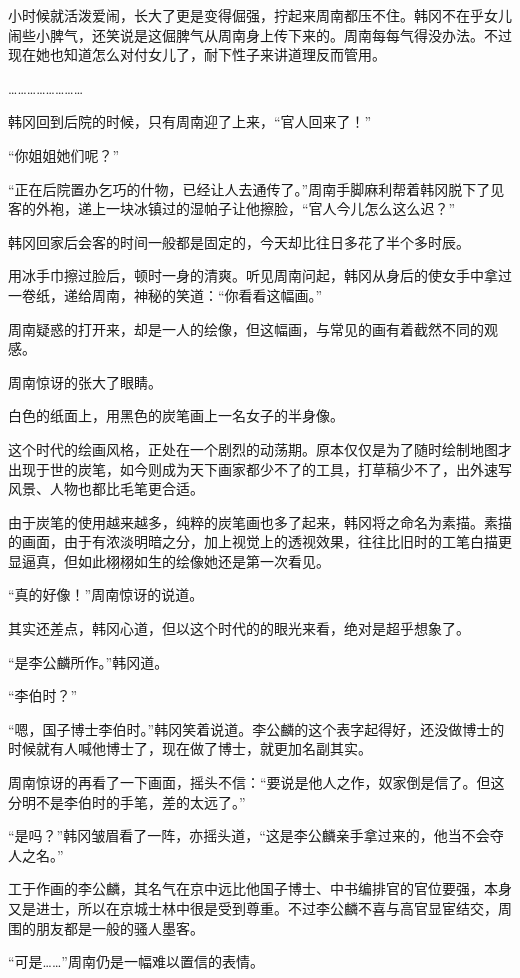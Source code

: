 小时候就活泼爱闹，长大了更是变得倔强，拧起来周南都压不住。韩冈不在乎女儿闹些小脾气，还笑说是这倔脾气从周南身上传下来的。周南每每气得没办法。不过现在她也知道怎么对付女儿了，耐下性子来讲道理反而管用。

……………………

韩冈回到后院的时候，只有周南迎了上来，“官人回来了！”

“你姐姐她们呢？”

“正在后院置办乞巧的什物，已经让人去通传了。”周南手脚麻利帮着韩冈脱下了见客的外袍，递上一块冰镇过的湿帕子让他擦脸，“官人今儿怎么这么迟？”

韩冈回家后会客的时间一般都是固定的，今天却比往日多花了半个多时辰。

用冰手巾擦过脸后，顿时一身的清爽。听见周南问起，韩冈从身后的使女手中拿过一卷纸，递给周南，神秘的笑道：“你看看这幅画。”

周南疑惑的打开来，却是一人的绘像，但这幅画，与常见的画有着截然不同的观感。

周南惊讶的张大了眼睛。

白色的纸面上，用黑色的炭笔画上一名女子的半身像。

这个时代的绘画风格，正处在一个剧烈的动荡期。原本仅仅是为了随时绘制地图才出现于世的炭笔，如今则成为天下画家都少不了的工具，打草稿少不了，出外速写风景、人物也都比毛笔更合适。

由于炭笔的使用越来越多，纯粹的炭笔画也多了起来，韩冈将之命名为素描。素描的画面，由于有浓淡明暗之分，加上视觉上的透视效果，往往比旧时的工笔白描更显逼真，但如此栩栩如生的绘像她还是第一次看见。

“真的好像！”周南惊讶的说道。

其实还差点，韩冈心道，但以这个时代的的眼光来看，绝对是超乎想象了。

“是李公麟所作。”韩冈道。

“李伯时？”

“嗯，国子博士李伯时。”韩冈笑着说道。李公麟的这个表字起得好，还没做博士的时候就有人喊他博士了，现在做了博士，就更加名副其实。

周南惊讶的再看了一下画面，摇头不信：“要说是他人之作，奴家倒是信了。但这分明不是李伯时的手笔，差的太远了。”

“是吗？”韩冈皱眉看了一阵，亦摇头道，“这是李公麟亲手拿过来的，他当不会夺人之名。”

工于作画的李公麟，其名气在京中远比他国子博士、中书编排官的官位要强，本身又是进士，所以在京城士林中很是受到尊重。不过李公麟不喜与高官显宦结交，周围的朋友都是一般的骚人墨客。

“可是……”周南仍是一幅难以置信的表情。

